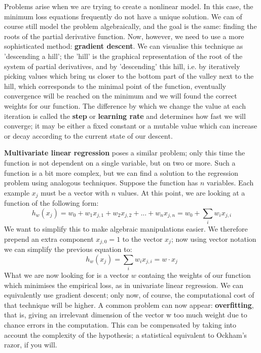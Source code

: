 \begin{itemize}
{    Problems arise when we are trying to create a nonlinear model. In
    this case, the minimum loss equations frequently do not have a unique
    solution. We can of course still model the problem algebraically, and
    the goal is the same: finding the roots of the partial derivative
    function. Now, however, we need to use a more sophisticated method:
    \textbf{gradient descent}. We can visualise this technique as
    'descending a hill'; the 'hill' is the graphical representation of the
    root of the system of partial derivatives, and by 'descending' this
    hill, i.e. by iteratively picking values which bring us closer to the
    bottom part of the valley next to the hill, which corresponds to the
    minimal point of the function, eventually convergence will be reached
    on the minimum and we will found the correct weights for our
    function. The difference by which we change the value at each
    iteration is called the \textbf{step} or \textbf{learning rate} and
    determines how fast we will converge; it may be either a fixed
    constant or a mutable value which can increase or decay according to
    the current state of our descent.

    \textbf{Multivariate linear regression} poses a similar problem;
    only this time the function is not dependent on a single variable, but
    on two or more. Such a function is a bit more complex, but we can
    find a solution to the regression problem using analogous
    techniques. Suppose the function has $n$ variables. Each example $x_j$
    must be a vector with $n$ values. At this point, we are looking at a
    function of the following form:
    \begin{equation}
      h_w(x_j) = w_0 + w_1x_{j,1} + w_2x_{j,2} + ... + w_nx_{j,n} = w_0 + \sum\limits_{i} w_ix_{j,i}
    \end{equation}
    We want to simplify this to make algebraic manipulations
    easier. We therefore prepend an extra component $x_{j,0} = 1$ to the
    vector $x_j$; now using vector notation we can simplify the
    previous equation to:
    \begin{equation}
      h_w(x_j) = \sum\limits_{i} w_ix_{j,i} = w \cdot x_j
    \end{equation}
    What we are now looking for is a vector $w$ containg the weights
    of our function which minimises the empirical loss, as in
    univariate linear regression. We can equivalently use gradient
    descent; only now, of course, the computational cost of that technique
    will be higher. A common problem can now appear: \textbf{overfitting},
    that is, giving an irrelevant dimension of the vector w too much
    weight due to chance errors in the computation. This can be
    compensated by taking into account the complexity of the hypothesis; a
    statistical equivalent to Ockham's razor, if you will.
  }


\end{itemize}
